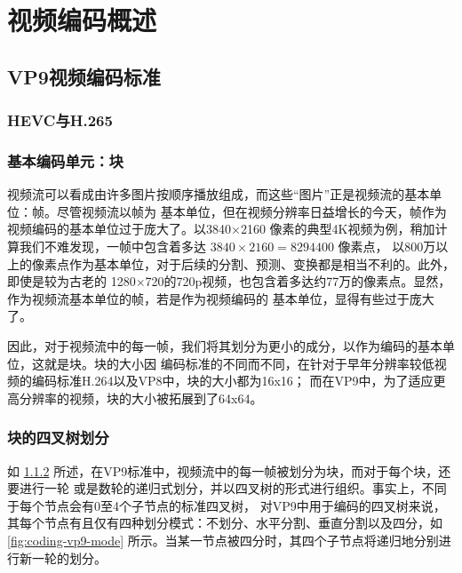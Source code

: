 \chapter{视频编码概述}
\label{cha:coding}

\section{VP9视频编码标准}
\label{sec:vp9}

\subsection{HEVC与H.265}



\subsection{基本编码单元：块}
\label{sec:block}

视频流可以看成由许多图片按顺序播放组成，而这些“图片”正是视频流的基本单位：帧。尽管视频流以帧为
基本单位，但在视频分辨率日益增长的今天，帧作为视频编码的基本单位过于庞大了。以3840×2160
像素的典型4K视频为例，稍加计算我们不难发现，一帧中包含着多达 $3840×2160 = 8294400$ 像素点，
以800万以上的像素点作为基本单位，对于后续的分割、预测、变换都是相当不利的。此外，即使是较为古老的
1280×720的720p视频，也包含着多达约77万的像素点。显然，作为视频流基本单位的帧，若是作为视频编码的
基本单位，显得有些过于庞大了。

因此，对于视频流中的每一帧，我们将其划分为更小的成分，以作为编码的基本单位，这就是块。块的大小因
编码标准的不同而不同，在针对于早年分辨率较低视频的编码标准H.264以及VP8中，块的大小都为16x16；
而在VP9中，为了适应更高分辨率的视频，块的大小被拓展到了64x64。



\subsection{块的四叉树划分}

如 \ref{sec:block} 所述，在VP9标准中，视频流中的每一帧被划分为块，而对于每个块，还要进行一轮
或是数轮的递归式划分，并以四叉树的形式进行组织。事实上，不同于每个节点会有0至4个子节点的标准四叉树，
对VP9中用于编码的四叉树来说，其每个节点有且仅有四种划分模式：不划分、水平分割、垂直分割以及四分，如
\ref{fig:coding-vp9-mode} 所示。当某一节点被四分时，其四个子节点将递归地分别进行新一轮的划分。

